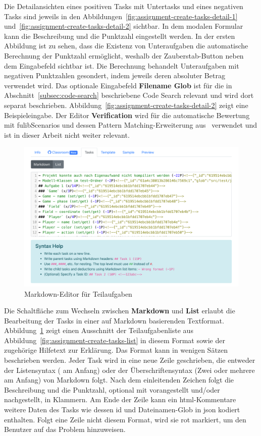 Die Detailansichten eines positiven Tasks mit Untertasks und eines negativen Tasks sind jeweils in den Abbildungen~\ref{fig:assignment-create-tasks-detail-1} und~\ref{fig:assignment-create-tasks-detail-2} sichtbar.
In dem modalen Formular kann die Beschreibung und die Punktzahl eingestellt werden.
In der ersten Abbildung ist zu sehen, dass die Existenz von Unteraufgaben die automatische Berechnung der Punktzahl ermöglicht, weshalb der Zauberstab-Button neben dem Eingabefeld sichtbar ist.
Die Berechnung behandelt Unteraufgaben mit negativen Punktzahlen gesondert, indem jeweils deren absoluter Betrag verwendet wird.
Das optionale Eingabefeld \textbf{Filename Glob} ist für die in Abschnitt~\ref{subsec:code-search} beschriebene Code Search relevant und wird dort separat beschrieben.
Abbildung~\ref{fig:assignment-create-tasks-detail-2} zeigt eine Beispieleingabe.
Der Editor \textbf{Verification} wird für die automatische Bewertung mit fulibScenarios und dessen Pattern Matching-Erweiterung aus~\cite{bachelor-thesis} verwendet und ist in dieser Arbeit nicht weiter relevant.

\begin{figure}
    \centering
    \includegraphics[width=\textwidth]{images/assignment-create-tasks-markdown}
    \caption{Markdown-Editor für Teilaufgaben}
    \label{fig:assignment-create-tasks-markdown}
\end{figure}

Die Schaltfläche zum Wechseln zwischen \textbf{Markdown} und \textbf{List} erlaubt die Bearbeitung der Tasks in einer auf Markdown basierenden Textformat.
Abbildung~\ref{fig:assignment-create-tasks-markdown} zeigt einen Ausschnitt der Teilaufgabenliste aus Abbildung~\ref{fig:assignment-create-tasks-list} in diesem Format sowie der zugehörige Hilfetext zur Erklärung.
Das Format kann in wenigen Sätzen beschrieben werden.
Jeder Task wird in eine neue Zeile geschrieben, die entweder der Listensyntax (\code{-} am Anfang) oder der Überschriftensyntax (Zwei oder mehrere \code{\#} am Anfang) von Markdown folgt.
Nach dem einleitenden Zeichen folgt die Beschreibung und die Punktzahl, optional mit  vorangestellt und/oder  nachgestellt, in Klammern.
Am Ende der Zeile kann ein \ac{html}-Kommentare weitere Daten des Tasks wie dessen \ac{id} und Dateinamen-Glob in \ac{json} kodiert enthalten.
Folgt eine Zeile nicht diesem Format, wird sie rot markiert, um den Benutzer auf das Problem hinzuweisen.

